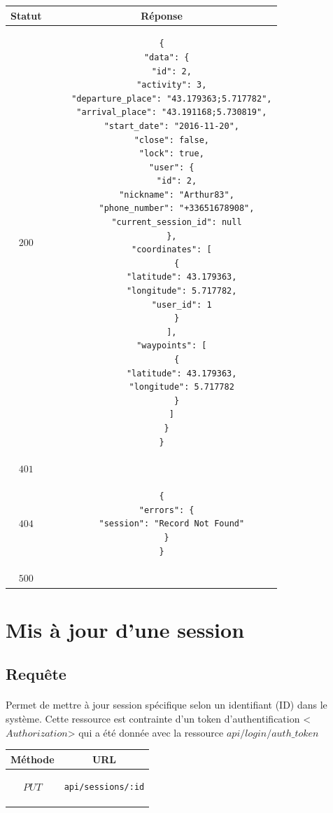 \documentclass[titlepage, 12pt]{report}
\begin{document}
\begin{center}
	\begin{tabular}{|c|c|}
		\hline
		Statut & Réponse \\
		\hline
		$ 200 $ & \begin{lstlisting}
{
  "data": {
    "id": 2,
    "activity": 3,
    "departure_place": "43.179363;5.717782",
    "arrival_place": "43.191168;5.730819",
    "start_date": "2016-11-20",
    "close": false,
    "lock": true,
    "user": {
      "id": 2,
      "nickname": "Arthur83",
      "phone_number": "+33651678908",
      "current_session_id": null
    },
    "coordinates": [
      {
        "latitude": 43.179363,
        "longitude": 5.717782,
        "user_id": 1
      }
    ],
    "waypoints": [
      {
        "latitude": 43.179363,
        "longitude": 5.717782
      }
    ]
  }
}
		\end{lstlisting} \\ 
		\hline
		$ 401 $ & \\
		\hline
		$ 404 $ & \begin{lstlisting}
{
  "errors": {
    "session": "Record Not Found"
  }
}
		\end{lstlisting} \\
		\hline
		$ 500 $ & \\
		\hline
	\end{tabular}
\end{center}

%
%

\section{Mis à jour d'une session}

\subsection{Requête}

\paragraph{} Permet de mettre à jour session spécifique selon un identifiant (ID) dans le système. Cette ressource est contrainte d'un token d'authentification <$Authorization$> qui a été donnée avec la ressource $api/login/auth\_token$

\begin{center}
	\begin{tabular}{|c|c|}
	\hline
	Méthode & URL \\
	\hline
	$ PUT $ 
	&
	\begin{lstlisting}
api/sessions/:id
	\end{lstlisting} 
	\\ \hline
	\end{tabular}
\end{center}
\end{document}

